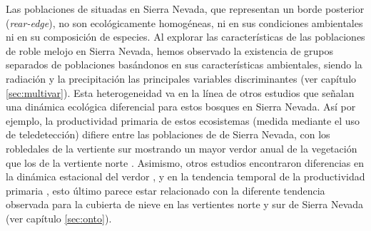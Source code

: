 Las poblaciones de \Qp situadas en Sierra Nevada, que representan un borde posterior (\emph{rear-edge}), no son ecológicamente homogéneas, ni en sus condiciones ambientales ni en su composición de especies. Al explorar las características de las poblaciones de roble melojo en Sierra Nevada, hemos observado la existencia de grupos separados de poblaciones basándonos en sus características ambientales, siendo la radiación y la precipitación las principales variables discriminantes (ver capítulo \ref{sec:multivar}). Esta heterogeneidad va en la línea de otros estudios que señalan una dinámica ecológica diferencial para estos bosques en Sierra Nevada. Así por ejemplo, la productividad primaria de estos ecosistemas (medida mediante el uso de teledetección) difiere entre las poblaciones de \Qp de Sierra Nevada, con los robledales de la vertiente sur mostrando un mayor verdor anual de la vegetación que los de la vertiente norte \autocites[ver capítulo \ref{sec:onto} ][]{Dionisioetal2012SatelliteBasedMonitoring,PerezLuqueetal2015OntologicalSystem,PerezLuqueetal2020LanduseLegacies}. Asimismo, otros estudios encontraron diferencias en la dinámica estacional del verdor \autocite{Dionisioetal2012SatelliteBasedMonitoring}, y en la tendencia temporal de la productividad primaria \autocites{PerezLuqueetal2015OntologicalSystem,AlcarazSeguraetal2016ChangesVegetation}, esto último parece estar relacionado con la diferente tendencia observada para la cubierta de nieve en las vertientes norte y sur de Sierra Nevada (ver capítulo \ref{sec:onto}).  

